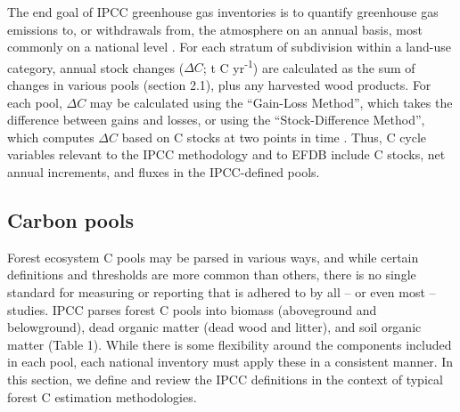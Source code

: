 \documentclass[, manuscript]{copernicus}
\begin{document}
The end goal of IPCC greenhouse gas inventories is to quantify
greenhouse gas emissions to, or withdrawals from, the atmosphere on an
annual basis, most commonly on a national level
\citep{ipcc_2006_2006, ipcc_2019_2019}. For each stratum of subdivision
within a land-use category, annual stock changes (\(\Delta C\); t C
yr\textsuperscript{-1}) are calculated as the sum of changes in various
pools (section 2.1), plus any harvested wood products. For each pool,
\(\Delta C\) may be calculated using the ``Gain-Loss Method'', which
takes the difference between gains and losses, or using the
``Stock-Difference Method'', which computes \(\Delta C\) based on C
stocks at two points in time \citep{ipcc_2006_2006}. Thus, C cycle
variables relevant to the IPCC methodology and to EFDB include C stocks,
net annual increments, and fluxes in the IPCC-defined pools.

\subsection{Carbon pools}

Forest ecosystem C pools may be parsed in various ways, and while
certain definitions and thresholds are more common than others, there is
no single standard for measuring or reporting that is adhered to by all
-- or even most -- studies. IPCC parses forest C pools into biomass
(aboveground and belowground), dead organic matter (dead wood and
litter), and soil organic matter (Table 1). While there is some
flexibility around the components included in each pool, each national
inventory must apply these in a consistent manner. In this section, we
define and review the IPCC definitions in the context of typical forest
C estimation methodologies.
\end{document}
